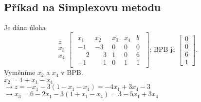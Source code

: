 \subsection{Příkad na Simplexovu metodu}
Je dána úloha
\begin{equation*}
    \begin{array}{c}
        \\
        z \\
        x_3 \\
        x_4 \\
    \end{array}
    \begin{bmatrix}
        \begin{array}{cccc|c}
            x_1 & x_2 & x_3 & x_4 & b \\ \hline
            -1 & -3 & 0 & 0 & 0 \\ \hline
            \phantom{-}2 & \phantom{-}3 & 1 & 0 & 6  \\
            -1 & \phantom{-}1 & 0 & 1 & 1
        \end{array}
    \end{bmatrix}
    \text{; BPB je }
    \begin{bmatrix}
        0 \\
        0 \\
        6 \\
        1
    \end{bmatrix}.
\end{equation*}
Vyměníme $x_2$ a $x_4$ v BPB.\\
$x_2 = 1 + x_1 - x_4$\\
$\rightarrow z = -x_1 - 3(1+x_1-x_4) = -4x_1 + 3x_4 - 3$\\
$\rightarrow x_3 = 6 - 2x_1 - 3(1+x_1-x_4) = 3-5x_1+3x_4$

